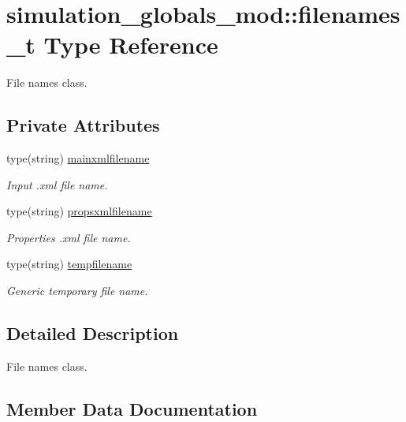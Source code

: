 \hypertarget{structsimulation__globals__mod_1_1filenames__t}{}\section{simulation\+\_\+globals\+\_\+mod\+:\+:filenames\+\_\+t Type Reference}
\label{structsimulation__globals__mod_1_1filenames__t}


File names class.  


\subsection*{Private Attributes}
\begin{DoxyCompactItemize}
\item 
type(string) \hyperlink{structsimulation__globals__mod_1_1filenames__t_af3e0ecdd0ab881ea2c2dd0a430d99d93}{mainxmlfilename}
\begin{DoxyCompactList}\small\item\em Input .xml file name. \end{DoxyCompactList}\item 
type(string) \hyperlink{structsimulation__globals__mod_1_1filenames__t_ae9790bc76014d831bfad281ab63e6f4c}{propsxmlfilename}
\begin{DoxyCompactList}\small\item\em Properties .xml file name. \end{DoxyCompactList}\item 
type(string) \hyperlink{structsimulation__globals__mod_1_1filenames__t_a207bede622cac14f7baef87cf0c000b7}{tempfilename}
\begin{DoxyCompactList}\small\item\em Generic temporary file name. \end{DoxyCompactList}\end{DoxyCompactItemize}


\subsection{Detailed Description}
File names class. 

\subsection{Member Data Documentation}
\mbox{\label{structsimulation__globals__mod_1_1filenames__t_af3e0ecdd0ab881ea2c2dd0a430d99d93}} 
